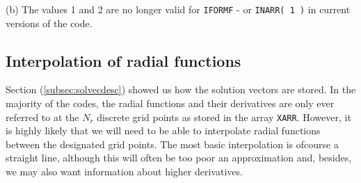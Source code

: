 (b) The values 1 and 2 are no longer valid for
\verb+IFORMF+ - or \verb+INARR( 1 )+ in current
versions of the code.


\subsection{Interpolation of radial functions}
\label{subsec:interpolation}

Section (\ref{subsec:solvecdesc}) showed us how the
solution vectors are stored. In the majority of
the codes, the radial functions and their derivatives
are only ever referred to at the $N_r$ discrete
grid points as stored in the array \verb+XARR+.
However, it is highly likely that we will need to be
able to interpolate radial functions between
the designated grid points.
The most basic interpolation is ofcourse a straight
line, although this will often be too poor an
approximation and, besides, we may also want 
information about higher derivatives.

